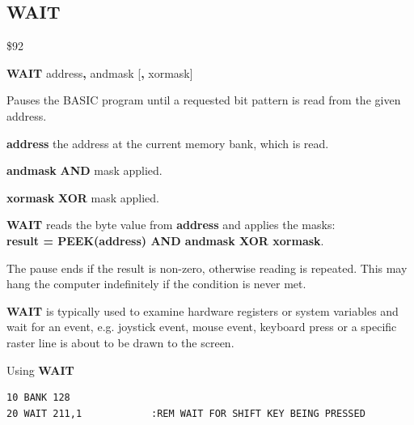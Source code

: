\subsection{WAIT}
\begin{description}[leftmargin=2cm,style=nextline]
\item [Token:] \$92
\item [Format:] {\bf WAIT} address{\bf,} andmask [{\bf,} xormask]
\item [Usage:] Pauses the BASIC program until a requested
               bit pattern is read from the given address.

               {\bf address} the address at the current memory
               bank, which is read.

               {\bf andmask} {\bf AND} mask applied.

               {\bf xormask} {\bf XOR} mask applied.

               {\bf WAIT} reads the byte value from {\bf address}
               and applies the masks: \\
               {\bf result = PEEK(address) AND andmask XOR xormask}.

               The pause ends if the result is non-zero, otherwise
               reading is repeated. This may hang the computer
               indefinitely if the condition is never met.

\item [Remarks:] {\bf WAIT} is typically used to examine hardware
               registers or system variables
               and wait for an event, e.g. joystick event,
               mouse event, keyboard press or a specific raster line
               is about to be drawn to the screen.

\item [Example:] Using {\bf WAIT}
\begin{tcolorbox}[colback=black,coltext=white]
\verbatimfont{\codefont}
\begin{verbatim}
10 BANK 128
20 WAIT 211,1            :REM WAIT FOR SHIFT KEY BEING PRESSED
\end{verbatim}
\end{tcolorbox}
\end{description}


\newpage
